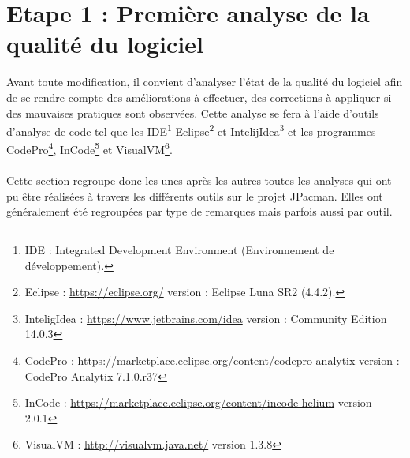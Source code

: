 \documentclass[12pt,a4paper,final]{article}
\begin{document}
\newpage
\section{Etape 1 : Première analyse de la qualité du logiciel}\label{sec:etape1}
Avant toute modification, il convient d'analyser l'état de la qualité du logiciel afin de se rendre compte des améliorations à effectuer, des corrections à appliquer si des mauvaises pratiques sont observées. Cette analyse se fera à l'aide d'outils d'analyse de code tel que les IDE\footnote{IDE : Integrated Development Environment (Environnement de développement).} Eclipse\footnote{Eclipse : \url{https://eclipse.org/} version : Eclipse Luna SR2 (4.4.2).} et IntelijIdea\footnote{InteligIdea : \url{https://www.jetbrains.com/idea} version : Community Edition 14.0.3 } et les programmes CodePro\footnote{CodePro : \url{https://marketplace.eclipse.org/content/codepro-analytix} version : CodePro Analytix 7.1.0.r37}, InCode\footnote{InCode : \url{https://marketplace.eclipse.org/content/incode-helium} version 2.0.1} et VisualVM\footnote{VisualVM : \url{http://visualvm.java.net/} version 1.3.8}.\\ \\
Cette section regroupe donc les unes après les autres toutes les analyses qui ont pu être réalisées à travers les différents outils sur le projet JPacman. Elles ont généralement été regroupées par type de remarques mais parfois aussi par outil.
\end{document}
